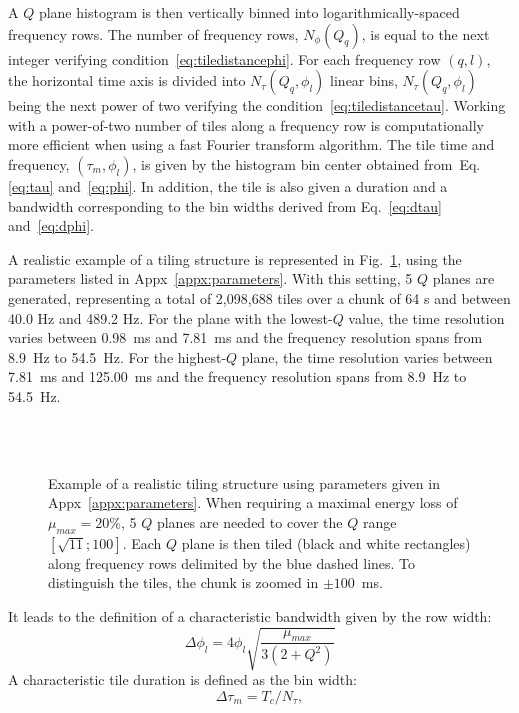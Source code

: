 A $Q$ plane histogram is then vertically binned into logarithmically-spaced frequency rows. The number of frequency rows, $N_\phi(Q_q)$, is equal to the next integer verifying condition~\ref{eq:tiledistancephi}. For each frequency row $(q,l)$, the horizontal time axis is divided into $N_\tau(Q_q,\phi_l)$ linear bins, $N_\tau(Q_q,\phi_l)$ being the next power of two verifying the condition~\ref{eq:tiledistancetau}. Working with a power-of-two number of tiles along a frequency row is computationally more efficient when using a fast Fourier transform algorithm. The tile time and frequency, $(\tau_m, \phi_l)$, is given by the histogram bin center obtained from~Eq.\ref{eq:tau} and~\ref{eq:phi}. In addition, the tile is also given a duration and a bandwidth corresponding to the bin widths derived from Eq.~\ref{eq:dtau} and~\ref{eq:dphi}.


A realistic example of a tiling structure is represented in Fig.~\ref{fig:tiling}, using the parameters listed in Appx~\ref{appx:parameters}. With this setting, 5 $Q$ planes are generated, representing a total of 2,098,688 tiles over a chunk of 64 s and between 40.0 Hz and 489.2 Hz. For the plane with the lowest-$Q$ value, the time resolution varies between 0.98~ms and 7.81~ms and the frequency resolution spans from 8.9~Hz to 54.5~Hz. For the highest-$Q$ plane, the time resolution varies between 7.81~ms and 125.00~ms and the frequency resolution spans from 8.9~Hz to 54.5~Hz.
\begin{figure}
  \center
    \\
    \\
  \caption{Example of a realistic tiling structure using parameters given in Appx~\ref{appx:parameters}. When requiring a maximal energy loss of $\mu_{max}=20\%$, 5 $Q$ planes are needed to cover the $Q$ range $[\sqrt{11}; 100]$. Each $Q$ plane is then tiled (black and white rectangles) along frequency rows delimited by the blue dashed lines. To distinguish the tiles, the chunk is zoomed in $\pm 100$~ms.}
  \label{fig:tiling}
\end{figure}

It leads to the definition of a characteristic bandwidth given by the row width:
\begin{equation}
  \Delta\phi_l = 4\phi_{l}\sqrt{\frac{\mu_{max}}{3(2+Q^2)}} 
  \label{eq:dphi}
\end{equation}
A characteristic tile duration is defined as the bin width:
\begin{equation}
  \Delta\tau_m = T_c / N_\tau,
  \label{eq:dtau}
\end{equation}


